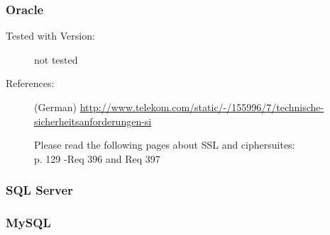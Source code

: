
\subsubsection{Oracle}
\begin{description}
\item[Tested with Version:] not tested

\item[References:] (German)
{\small \url{http://www.telekom.com/static/-/155996/7/technische-sicherheitsanforderungen-si}}

Please read the following pages about SSL and ciphersuites:\\
p. 129 -Req 396 and Req 397 \\

\end{description}

\subsubsection{SQL Server}




\subsubsection{MySQL}

